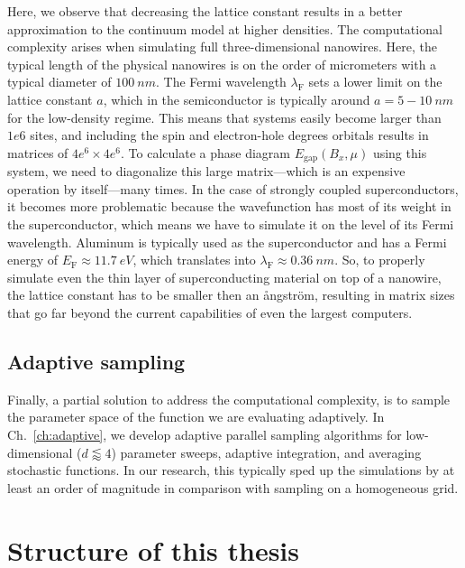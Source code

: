 Here, we observe that decreasing the lattice constant results in a better approximation to the continuum model at higher densities.
The computational complexity arises when simulating full three-dimensional nanowires.
Here, the typical length of the physical nanowires is on the order of micrometers with a typical diameter of $\SI{100}{nm}$.
The Fermi wavelength $\lambda_\textrm{F}$ sets a lower limit on the lattice constant $a$, which in the semiconductor is typically around $a=5-\SI{10}{nm}$ for the low-density regime.
This means that systems easily become larger than $1e6$ sites, and including the spin and electron-hole degrees orbitals results in matrices of $4e^6 \times 4e^6$.
To calculate a phase diagram $E_\textrm{gap}(B_x,\mu)$ using this system, we need to diagonalize this large matrix---which is an expensive operation by itself---many times.
In the case of strongly coupled superconductors, it becomes more problematic because the wavefunction has most of its weight in the superconductor, which means we have to simulate it on the level of its Fermi wavelength.
Aluminum is typically used as the superconductor and has a Fermi energy of $E_\textrm{F} \approx \SI{11.7}{eV}$, which translates into $\lambda_\textrm{F} \approx \SI{0.36}{nm}$.
So, to properly simulate even the thin layer of superconducting material on top of a nanowire, the lattice constant has to be smaller then an ångström, resulting in matrix sizes that go far beyond the current capabilities of even the largest computers.

\subsection{Adaptive sampling}
Finally, a partial solution to address the computational complexity, is to sample the parameter space of the function we are evaluating adaptively.
In Ch.~\ref{ch:adaptive}, we develop adaptive parallel sampling algorithms for low-dimensional ($d\lessapprox 4$) parameter sweeps, adaptive integration, and averaging stochastic functions.
In our research, this typically sped up the simulations by at least an order of magnitude in comparison with sampling on a homogeneous grid.




\section{Structure of this thesis}

